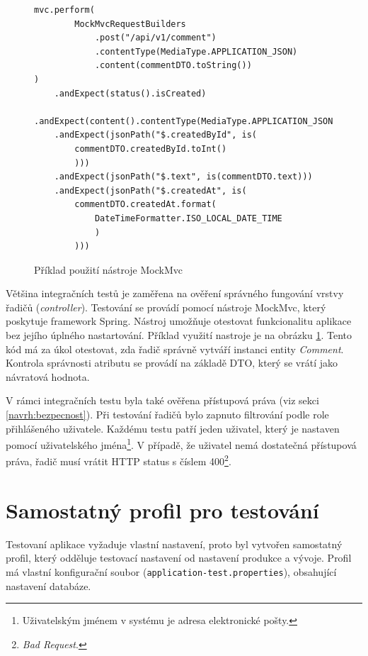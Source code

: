         \begin{figure}
        \begin{verbatim}
mvc.perform(
        MockMvcRequestBuilders
            .post("/api/v1/comment")
            .contentType(MediaType.APPLICATION_JSON)
            .content(commentDTO.toString())
)
    .andExpect(status().isCreated)
    .andExpect(content().contentType(MediaType.APPLICATION_JSON))
    .andExpect(jsonPath("$.createdById", is(
        commentDTO.createdById.toInt()
        )))
    .andExpect(jsonPath("$.text", is(commentDTO.text)))
    .andExpect(jsonPath("$.createdAt", is(
        commentDTO.createdAt.format(
            DateTimeFormatter.ISO_LOCAL_DATE_TIME
            )
        )))

        \end{verbatim}
        \caption{Příklad použití nástroje MockMvc} 
        \label{code:mockmvc}
    \end{figure}
    Většina integračních testů je zaměřena na ověření správného fungování vrstvy řadičů (\textit{controller}). Testování se provádí pomocí nástroje MockMvc\cite{mock-mvc}, který poskytuje framework Spring. Nástroj umožňuje otestovat funkcionalitu aplikace bez jejího úplného nastartování. Příklad využití nastroje je na obrázku \ref{code:mockmvc}. Tento kód má za úkol otestovat, zda řadič správně vytváří instanci entity \textit{Comment}. Kontrola správnosti atributu se provádí na základě DTO, který se vrátí jako návratová hodnota.
    
    V rámci integračních testu byla také ověřena přístupová práva (viz sekci \ref{navrh:bezpecnost}). Při testování řadičů bylo zapnuto filtrování podle role přihlášeného uživatele. Každému testu patří jeden uživatel, který je nastaven pomocí uživatelského jména\footnote{Uživatelským jménem v systému je adresa elektronické pošty.}. V případě, že uživatel nemá dostatečná přístupová práva, řadič musí vrátit HTTP status s číslem 400\footnote{\textit{Bad Request}.}.
    
\section{Samostatný profil pro testování}

    Testovaní aplikace vyžaduje vlastní nastavení, proto byl vytvořen samostatný profil, který odděluje testovací nastavení od nastavení produkce a vývoje. Profil má vlastní konfigurační soubor (\verb|application-test.properties|), obsahující nastavení databáze.
    
